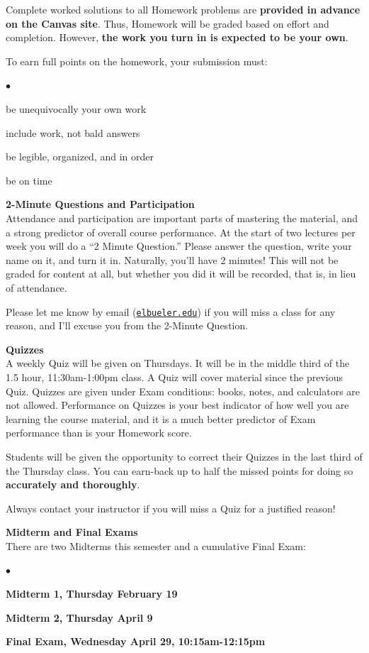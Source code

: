 \documentclass[12pt]{article}
\renewcommand{\emph}[1]{\textsf{\textbf{#1}}}
\newcommand{\localhead}[1]{\par\smallskip\textbf{#1} \smallskip\nobreak\\}%
\def\heading#1{\localhead{\large\emph{#1}}}
\newenvironment{clist}%
{\bgroup\parskip 0pt\begin{list}{$\bullet$}{\partopsep 4pt\topsep 0pt\itemsep -2pt}}%
{\end{list}\egroup}%
\begin{document}
Complete worked solutions to all Homework problems are \textbf{provided in advance on the Canvas site}.  Thus, Homework will be graded based on {effort} and {completion}. However, \textbf{the work you turn in is expected to be your own}.  

To earn full points on the homework, your submission must:
\vskip -20pt\strut
\begin{clist}
\item be unequivocally your own work
\item include work, not bald answers
\item be legible, organized, and in order
\item be on time
\end{clist}

\heading{2-Minute Questions and Participation}
Attendance and participation are important parts of mastering the material, and a strong predictor of overall course performance.  At the start of two lectures per week you will do a ``2 Minute Question.''  Please answer the question, write your name on it, and turn it in.  Naturally, you'll have 2 minutes!  This will not be graded for content at all, but whether you did it will be recorded, that is, in lieu of attendance.

Please let me know by email (\href{mailto:elbueler@alaska.edu}{\texttt{elbueler\@@alaska.edu}}) if you will miss a class for any reason, and I'll excuse you from the 2-Minute Question.


\heading{Quizzes}
A weekly Quiz will be given on Thursdays.  It will be in the middle third of the 1.5 hour, 11:30am-1:00pm class.  A Quiz will cover material since the previous Quiz.  Quizzes are given under Exam conditions: books, notes, and calculators are not allowed.  Performance on Quizzes is your best indicator of how well you are learning the course material, and it is a much better predictor of Exam performance than is your Homework score.

Students will be given the opportunity to correct their Quizzes in the last third of the Thursday class.  You can earn-back up to half the missed points for doing so \textbf{accurately and thoroughly}.

Always contact your instructor if you will miss a Quiz for a justified reason!  

\heading{Midterm and Final Exams}
There are two Midterms this semester and a cumulative Final Exam:
\vskip -20pt\strut
\begin{clist}
\item \emph{Midterm 1, Thursday February 19}
\item \emph{Midterm 2, Thursday April 9}
\item  \emph{Final Exam, Wednesday April 29, 10:15am-12:15pm}
\end{clist} 
\end{document}
